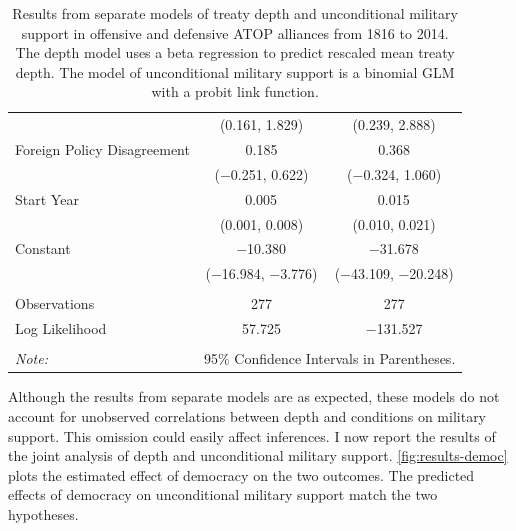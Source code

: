 \documentclass[12pt]{article}
\begin{document}
\begin{table}[!htbp]
\begin{tabular}{@{\extracolsep{5pt}}lcc}
  & (0.161, 1.829) & (0.239, 2.888) \\ 
  Foreign Policy Disagreement & 0.185 & 0.368 \\ 
  & ($-$0.251, 0.622) & ($-$0.324, 1.060) \\ 
  Start Year & 0.005$^{}$ & 0.015$^{}$ \\ 
  & (0.001, 0.008) & (0.010, 0.021) \\ 
  Constant & $-$10.380$^{}$ & $-$31.678$^{}$ \\ 
  & ($-$16.984, $-$3.776) & ($-$43.109, $-$20.248) \\ 
 \hline \\[-1.8ex] 
Observations & 277 & 277 \\ 
Log Likelihood & 57.725 & $-$131.527 \\ 
\hline 
\hline \\[-1.8ex] 
\textit{Note:}  & \multicolumn{2}{r}{95\% Confidence Intervals in Parentheses.} \\ 
\end{tabular} 
 \caption{Results from separate models of treaty depth and unconditional military support in offensive and defensive ATOP alliances from 1816 to 2014. The depth model uses a beta regression to predict rescaled mean treaty depth. The model of unconditional military support is a binomial GLM with a probit link function.} 
  \label{tab:separate-models} 
\end{table} 


Although the results from separate models are as expected, these models do not account for unobserved correlations between depth and conditions on military support. 
This omission could easily affect inferences. 
I now report the results of the joint analysis of depth and unconditional military support. 
\autoref{fig:results-democ} plots the estimated effect of democracy on the two outcomes. 
The predicted effects of democracy on unconditional military support match the two hypotheses. 
\end{document}

